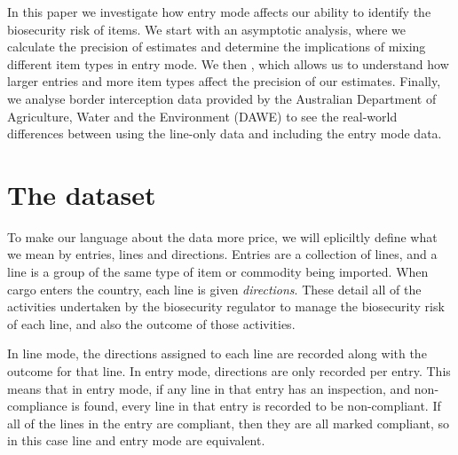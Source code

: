 \documentclass{article}
\begin{document}
In this paper we investigate how entry mode affects our ability to identify the biosecurity risk of items. We start with an asymptotic analysis, where we calculate the precision of estimates and determine the implications of mixing different item types in entry mode. We then  , which allows us to understand how larger entries and more item types affect the precision of our estimates. Finally, we analyse border interception data provided by the Australian Department of Agriculture, Water and the Environment (DAWE) to see the real-world differences between using the line-only data and including the entry mode data.

\section{The dataset}\label{sec:data}

To make our language about the data more price, we will epliciltly define what we mean by entries, lines and directions. Entries are a collection of lines, and a line is a group of the same type of item or commodity being imported. When cargo enters the country, each line is given \emph{directions}. These detail all of the activities undertaken by the biosecurity regulator to manage the biosecurity risk of each line, and also the outcome of those activities.

In line mode, the directions assigned to each line are recorded along with the outcome for that line. In entry mode, directions are only recorded per entry. This means that in entry mode, if any line in that entry has an inspection, and non-compliance is found, every line in that entry is recorded to be non-compliant. If all of the lines in the entry are compliant, then they are all marked compliant, so in this case line and entry mode are equivalent.
\end{document}
